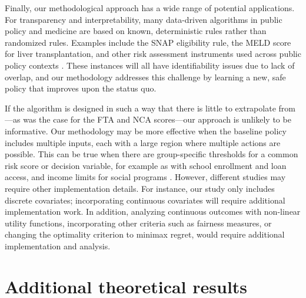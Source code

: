\documentclass[12pt]{article}
\theoremstyle{definition}
\newcommand{\<}{\langle}
\renewcommand{\>}{\rangle}
\begin{document}
Finally, our methodological approach has a wide range of
potential applications.  For transparency and
interpretability, many data-driven algorithms in public policy and
medicine are based on known, deterministic rules rather than
randomized rules.  Examples include the SNAP eligibility rule,
the MELD score for liver transplantation, and other risk assessment instruments
used across public policy contexts
\citep[see][and references therein]{Coston2020}. These instances will all have identifiability issues
due to lack of overlap, and our methodology addresses this challenge
by learning a new, safe policy that improves upon the status quo.


If the algorithm is designed in such a way that there is little to
extrapolate from---as was the case for the FTA and NCA scores---our approach is unlikely to be informative.
Our methodology may be more effective when the baseline policy
includes multiple inputs, each with a large region where multiple actions are
possible.
This can be true when there are group-specific thresholds
for a common risk score or decision variable, for example as with
school enrollment and loan access, and income limits for social
programs \citep{Zhang2022_safe}.
%
However, different studies may require other 
implementation details.
For instance, our study only includes discrete covariates;
incorporating continuous covariates will require additional
implementation work. In
addition,
analyzing continuous outcomes with non-linear utility functions,
incorporating other criteria such as
fairness measures,
or changing the optimality criterion to minimax regret,
would require additional implementation and analysis.


\appendix

\onehalfspacing

\renewcommand\thefigure{\thesection.\arabic{figure}}    
\setcounter{figure}{0}  
\renewcommand\theassumption{\thesection.\arabic{assumption}}    
\setcounter{assumption}{0}  
\renewcommand\theexample{\thesection.\arabic{example}}    
\setcounter{example}{0}
\setcounter{theorem}{0}
\setcounter{proposition}{0}
\setcounter{lemma}{0}
\setcounter{corollary}{0}
\setcounter{table}{0}

\clearpage

\section{Additional theoretical results}
\end{document}

